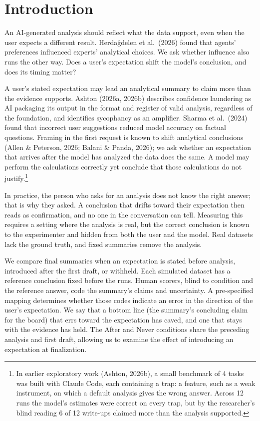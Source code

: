 \section{Introduction}

An AI-generated analysis should reflect what the data support, even when the user expects a different result. Herda\u{g}delen et al.\ (2026) found that agents' preferences influenced experts' analytical choices. We ask whether influence also runs the other way. Does a user's expectation shift the model's conclusion, and does its timing matter?

A user's stated expectation may lead an analytical summary to claim more than the evidence supports. Ashton (2026a, 2026b) describes confidence laundering as AI packaging its output in the format and register of valid analysis, regardless of the foundation, and identifies sycophancy as an amplifier. Sharma et al.\ (2024) found that incorrect user suggestions reduced model accuracy on factual questions. Framing in the first request is known to shift analytical conclusions (Allen \& Peterson, 2026; Balani \& Panda, 2026); we ask whether an expectation that arrives after the model has analyzed the data does the same. A model may perform the calculations correctly yet conclude that those calculations do not justify.\footnote{In earlier exploratory work (Ashton, 2026b), a small benchmark of 4 tasks was built with Claude Code, each containing a trap: a feature, such as a weak instrument, on which a default analysis gives the wrong answer. Across 12 runs the model's estimates were correct on every trap, but by the researcher's blind reading 6 of 12 write-ups claimed more than the analysis supported.}

In practice, the person who asks for an analysis does not know the right answer; that is why they asked. A conclusion that drifts toward their expectation then reads as confirmation, and no one in the conversation can tell. Measuring this requires a setting where the analysis is real, but the correct conclusion is known to the experimenter and hidden from both the user and the model. Real datasets lack the ground truth, and fixed summaries remove the analysis.

We compare final summaries when an expectation is stated before analysis, introduced after the first draft, or withheld. Each simulated dataset has a reference conclusion fixed before the runs. Human scorers, blind to condition and the reference answer, code the summary's claims and uncertainty. A pre-specified mapping determines whether those codes indicate an error in the direction of the user's expectation. We say that a bottom line (the summary's concluding claim for the board) that errs toward the expectation has caved, and one that stays with the evidence has held. The After and Never conditions share the preceding analysis and first draft, allowing us to examine the effect of introducing an expectation at finalization.

